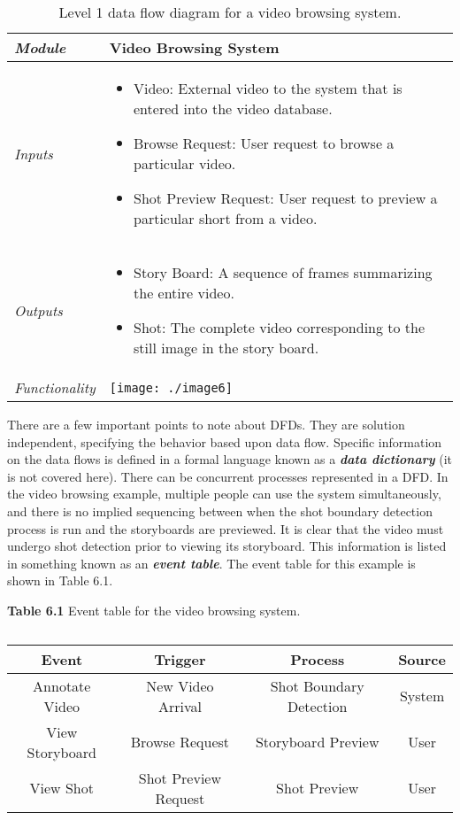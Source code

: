 \begin{table}
\caption{Level 1 data flow diagram for a video browsing system.}
\label{table:dataflowVideoBrowse}
\begin{tabular}{|l|m{10cm}|}
\hline
\emph{Module} & Video Browsing System \\ \hline

\emph{Inputs} & 
\begin{itemize}
\item
  Video: External video to the system that is entered into the video
  database.
\item
  Browse Request: User request to browse a particular video.
\item
  Shot Preview Request: User request to preview a particular short from
  a video.
\end{itemize}  \\ \hline
\emph{Outputs} & 
\begin{itemize}
\item
  Story Board: A sequence of frames summarizing the entire video.
\item
  Shot: The complete video corresponding to the still image in the story
  board.
\end{itemize}\\ \hline
\emph{Functionality} &
\texttt{[image: ./image6]} \\
\end{tabular}
\end{table}

There are a few important points to note about DFDs. They are solution
independent, specifying the behavior based upon data flow. Specific
information on the data flows is defined in a formal language known as a
\emph{\textbf{data dictionary}} (it is not covered here). There can be
concurrent processes represented in a DFD. In the video browsing
example, multiple people can use the system simultaneously, and there is
no implied sequencing between when the shot boundary detection process
is run and the storyboards are previewed. It is clear that the video
must undergo shot detection prior to viewing its storyboard. This
information is listed in something known as an \emph{\textbf{event
table}}. The event table for this example is shown in Table 6.1.

\textbf{Table 6.1} Event table for the video browsing system.

\begin{table}
\caption{}
\label{table:<context>}
\begin{tabular}{|c|c|c|c|}
\hline
\textbf{Event} & \textbf{Trigger}& \textbf{Process} & \textbf{Source} \\ \hline
Annotate Video & New Video Arrival & Shot Boundary Detection & System \\  \hline
View Storyboard & Browse Request & Storyboard Preview & User \\ \hline
View Shot & Shot Preview Request & Shot Preview & User \\ \hline
\end{tabular}
\end{table}

